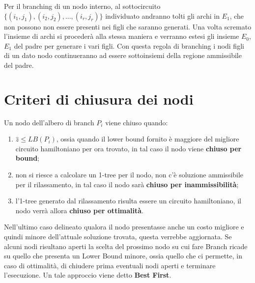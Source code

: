 \documentclass[
	article,			%
	12pt,				%
	oneside,			%
	a4paper,			%
	english,			%
	italian,				%
	sumario=tradicional,
	]{abntex2}
\begin{document}
\newline
Per il branching di un nodo interno, al sottocircuito $\{(i_1, j_1), (i_2,j_2),...,(i_r,j_r)\}$ individuato andranno tolti gli archi in $E_1$, che non possono non essere presenti nei figli che saranno generati. Una volta scremato l'insieme di archi si procederà alla stessa maniera e verranno estesi gli insieme $E_0$, $E_1$ del padre per generare i vari figli.
\newline
Con questa regola di branching i nodi figli di un dato nodo continueranno ad essere sottoinsiemi della regione ammissibile del padre.

\section{Criteri di chiusura dei nodi}
Un nodo dell'albero di branch $P_i$ viene chiuso quando:
\begin{enumerate}
    \item $\hat{z} \leq LB(P_i)$, ossia quando il lower bound fornito è maggiore del migliore circuito hamiltoniano per ora trovato, in tal caso il nodo viene \textbf{chiuso per bound};
    \item non si riesce a calcolare un 1-tree per il nodo, non c'è soluzione ammissibile per il rilassamento, in tal caso il nodo sarà \textbf{chiuso per inammissibilità};
    \item l'1-tree generato dal rilassamento risulta essere un circuito hamiltoniano, il nodo verrà allora \textbf{chiuso per ottimalità}.
\end{enumerate}
Nell'ultimo caso delineato qualora il nodo presentasse anche un costo migliore e quindi minore dell'attuale soluzione trovata, questa verrebbe aggiornata.
\newline
Se alcuni nodi risultano aperti la scelta del prossimo nodo su cui fare Branch ricade su quello che presenta un Lower Bound minore, ossia quello che ci permette, in caso di ottimalità, di chiudere prima eventuali nodi aperti e terminare l'esecuzione. Un tale approccio viene detto \textbf{Best First}.
\end{document}
